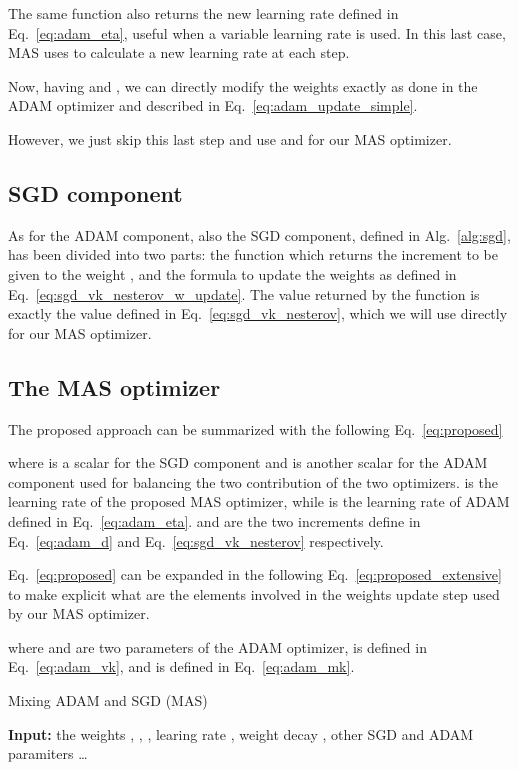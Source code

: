 \documentclass[10pt,twocolumn,letterpaper]{article}
\begin{document}
The same  function also returns the new learning rate  defined in Eq.~\ref{eq:adam_eta}, useful when a variable learning rate is used.
In this last case, MAS uses  to calculate a new learning rate at each step.

Now, having   and , we can directly modify the weights   exactly as done in the ADAM optimizer and described in Eq.~\ref{eq:adam_update_simple}.

However, we just skip this last step and use  and  for our MAS optimizer.



\subsection{SGD component}
As for the ADAM component, also the SGD component, defined in Alg.~\ref{alg:sgd}, has been divided into two parts: the  function which returns the increment to be given to the weight , and the formula to update the weights as defined in Eq.~\ref{eq:sgd_vk_nesterov_w_update}.
The  value returned by the  function is exactly the value defined in Eq.~\ref{eq:sgd_vk_nesterov}, which we will use directly for our MAS optimizer.





\subsection{The MAS optimizer}
The proposed approach can be summarized with the following Eq.~\ref{eq:proposed}

where  is a scalar for the SGD component and  is another scalar for the ADAM component used for balancing the two contribution of the two optimizers. 
 is the learning rate of the proposed MAS optimizer, while  is the learning rate of ADAM defined in Eq.~\ref{eq:adam_eta}.
 and  are the two increments define in Eq.~\ref{eq:adam_d} and Eq.~\ref{eq:sgd_vk_nesterov} respectively.

Eq.~\ref{eq:proposed} can be expanded in the following Eq.~\ref{eq:proposed_extensive} to make explicit what are the elements involved in the weights update step used by our MAS optimizer.

where  and  are two parameters of the ADAM optimizer,  is defined in Eq.~\ref{eq:adam_vk}, and  is defined in Eq.~\ref{eq:adam_mk}.


\begin{algorithm} \scriptsize
\caption{ Mixing ADAM and SGD (MAS)}
\textbf{Input:} the weights , , , learing rate , weight decay , other SGD and ADAM paramiters \dots
\begin{algorithmic}[1]
        \State {}
        \State {}
        \State {}
         \State {}
        \State{}
    \EndFor
\end{algorithmic}
\label{alg:proposed}
\end{algorithm}
\end{document}
